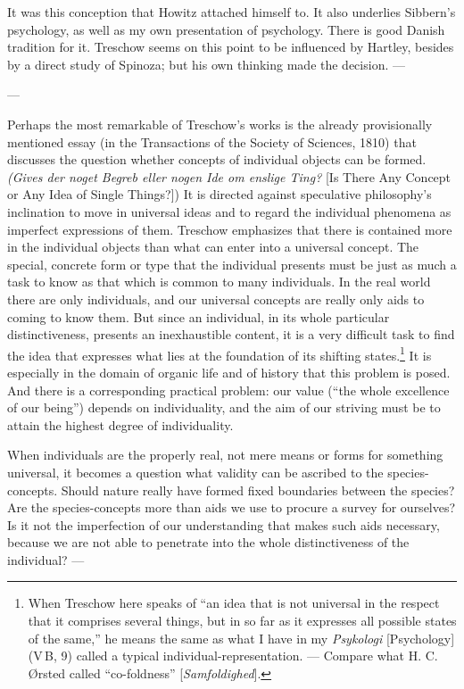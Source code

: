 \documentclass[12pt,a4paper]{book}
\newcommand{\opage}[1]{\marginnote{\footnotesize\textit{[#1]}}}
\begin{document}
It was this conception that Howitz attached himself to. It also underlies Sibbern's
psychology, as well as my own presentation of psychology. There is good Danish tradition
for it. Treschow seems on this point to be influenced by Hartley, besides by a direct
study of Spinoza; but his own thinking made the decision. ---

\begin{center}---\end{center}

Perhaps the most remarkable of Treschow's works is the already provisionally mentioned
essay (in the Transactions of the Society of Sciences, 1810) that discusses the question
whether concepts of individual objects can be formed. \emph{(Gives der noget Begreb
eller nogen Ide om enslige Ting?} [Is There Any Concept or Any Idea of Single Things?])
It is directed against speculative philosophy's inclination to move in universal ideas
and to regard the individual phenomena as imperfect expressions of them. Treschow
emphasizes that there is contained more in the individual objects than what can enter
into a universal concept. The special, concrete form or type that the individual
presents must be just as much a task to know as that which is common to many
individuals. In the real world there are only individuals, and our universal concepts
are really only aids to coming to know them. But since an individual, in its whole
particular distinctiveness, presents an \opage{92}inexhaustible content, it is a very difficult
task to find the idea that expresses what lies at the foundation of its shifting
states.\footnote{When Treschow here speaks of ``an idea that is not universal in the
respect that it comprises several things, but in so far as it expresses all possible
states of the same,'' he means the same as what I have in my \emph{Psykologi}
[Psychology] (V\,B, 9) called a typical individual-representation. --- Compare what H. C.
Ørsted called ``co-foldness'' [\emph{Samfoldighed}].} It is especially in the domain of
organic life and of history that this problem is posed. And there is a corresponding
practical problem: our value (``the whole excellence of our being'') depends on
individuality, and the aim of our striving must be to attain the highest degree of
individuality.

When individuals are the properly real, not mere means or forms for something universal,
it becomes a question what validity can be ascribed to the species-concepts. Should
nature really have formed fixed boundaries between the species? Are the species-concepts
more than aids we use to procure a survey for ourselves? Is it not the imperfection of
our understanding that makes such aids necessary, because we are not able to penetrate
into the whole distinctiveness of the individual? ---
\end{document}

